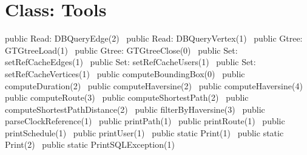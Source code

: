 \section*{Class: Tools}
\nwenddocs{}\endmoddef{}
public \LA{}Read: DBQueryEdge(2)~{\nwtagstyle{}}\RA{}
public \LA{}Read: DBQueryVertex(1)~{\nwtagstyle{}}\RA{}
\nwendcode{}\nwdocspar
{}
\nwenddocs{}\plusendmoddef
\nwendcode{}\nwdocspar
{}
\nwenddocs{}\plusendmoddef
public \LA{}Gtree: GTGtreeLoad(1)~{\nwtagstyle{}}\RA{}
public \LA{}Gtree: GTGtreeClose(0)~{\nwtagstyle{}}\RA{}
public \LA{}Set: setRefCacheEdges(1)~{\nwtagstyle{}}\RA{}
public \LA{}Set: setRefCacheUsers(1)~{\nwtagstyle{}}\RA{}
public \LA{}Set: setRefCacheVertices(1)~{\nwtagstyle{}}\RA{}
public \LA{}computeBoundingBox(0)~{\nwtagstyle{}}\RA{}
public \LA{}computeDuration(2)~{\nwtagstyle{}}\RA{}
public \LA{}computeHaversine(2)~{\nwtagstyle{}}\RA{}
public \LA{}computeHaversine(4)~{\nwtagstyle{}}\RA{}
public \LA{}computeRoute(3)~{\nwtagstyle{}}\RA{}
public \LA{}computeShortestPath(2)~{\nwtagstyle{}}\RA{}
public \LA{}computeShortestPathDistance(2)~{\nwtagstyle{}}\RA{}
public \LA{}filterByHaversine(3)~{\nwtagstyle{}}\RA{}
public \LA{}parseClockReference(1)~{\nwtagstyle{}}\RA{}
public \LA{}printPath(1)~{\nwtagstyle{}}\RA{}
public \LA{}printRoute(1)~{\nwtagstyle{}}\RA{}
public \LA{}printSchedule(1)~{\nwtagstyle{}}\RA{}
public \LA{}printUser(1)~{\nwtagstyle{}}\RA{}
public static \LA{}Print(1)~{\nwtagstyle{}}\RA{}
public static \LA{}Print(2)~{\nwtagstyle{}}\RA{}
public static \LA{}PrintSQLException(1)~{\nwtagstyle{}}\RA{}
\nwendcode{}\nwdocspar

